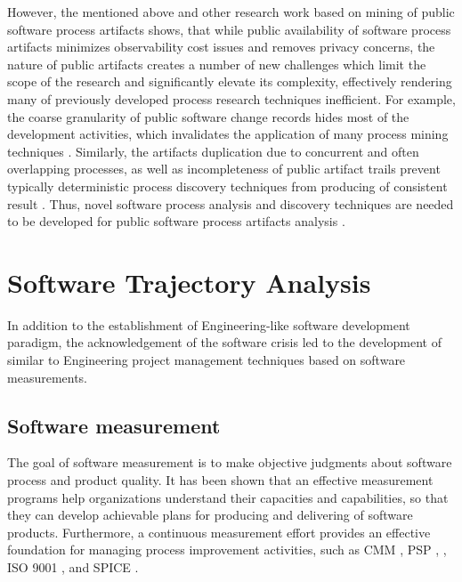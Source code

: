 However, the mentioned above and other research work based on mining of public software process artifacts shows, 
that while public availability of software process artifacts minimizes observability cost issues and removes privacy concerns, 
the nature of public artifacts creates a number of new challenges which limit the scope of the research and 
significantly elevate its complexity, effectively rendering many of previously developed process research techniques 
inefficient. 
For example, the coarse granularity of public software change records hides most of the development activities, 
which invalidates the application of many process mining techniques \cite{citeulike:10377366} \cite{citeulike:2678511}.
Similarly, the artifacts duplication due to concurrent and often overlapping processes, as well as incompleteness of 
public artifact trails prevent typically deterministic process discovery techniques from producing of consistent 
result \cite{citeulike:2678511}.
Thus, novel software process analysis and discovery techniques are needed to be developed for public software 
process artifacts analysis \cite{citeulike:7853299}.

%
%
\section{Software Trajectory Analysis}\label{section_software_trajectory}
In addition to the establishment of Engineering-like software development paradigm, the acknowledgement of 
the software crisis led to the development of similar to Engineering project management techniques based on 
software measurements.

\subsection{Software measurement}
The goal of software measurement is to make objective judgments about software process and product quality. 
It has been shown that an effective measurement programs help organizations understand their capacities and 
capabilities, so that they can develop achievable plans for producing and delivering of software products. 
Furthermore, a continuous measurement effort provides an effective foundation for managing process 
improvement activities, 
such as CMM \cite{citeulike:9962021}, 
PSP \cite{citeulike:8347315}, \cite{citeulike:5090131} \cite{citeulike:12929216}, 
ISO 9001 \cite{iso-standard}, and SPICE \cite{spice-standard}.

